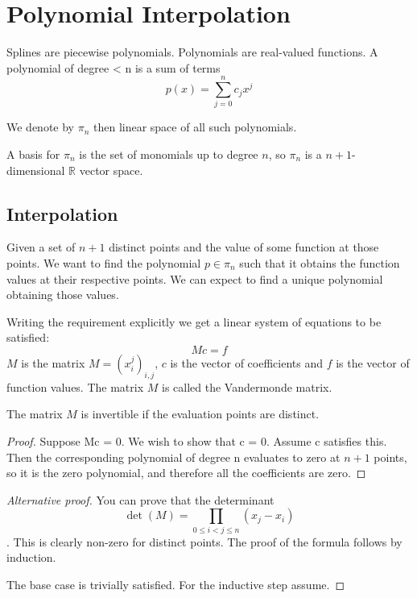 
\chapter{Polynomial Interpolation}

Splines are piecewise polynomials.
Polynomials are real-valued functions.
A polynomial of degree < n is a sum of terms
\begin{equation*}
p(x) = \sum_{j=0}^n c_j x^j
\end{equation*}

We denote by $\pi_n$ then linear space of all such polynomials.

A basis for $\pi_n$ is the set of monomials up to degree $n$, so $\pi_n$ is a $n + 1$-dimensional $\mathbb R$ vector space.

\section{Interpolation}

Given a set of $n + 1$ distinct points and the value of some function at those points.
We want to find the polynomial $p\in\pi_n$ such that it obtains the function values at their respective points.
We can expect to find a unique polynomial obtaining those values.

Writing the requirement explicitly we get a linear system of equations to be satisfied:
\begin{equation*}
Mc = f
\end{equation*}
$M$ is the matrix $M=(x_i^j)_{i,j}$, $c$ is the vector of coefficients and $f$ is the vector of function values.
The matrix $M$ is called the Vandermonde matrix. 

\begin{theorem}
The matrix $M$ is invertible if the evaluation points are distinct.
\end{theorem}
\begin{proof}
Suppose Mc = 0. We wish to show that c = 0.
Assume c satisfies this. Then the corresponding polynomial of degree n evaluates to zero at $n + 1$ points, so it is the zero polynomial, and therefore all the coefficients are zero.
\end{proof}

\begin{proof}[Alternative proof]
You can prove that the determinant
\begin{equation*}
\det(M)= \prod_{0\leq i < j \leq n} (x_j - x_i)
\end{equation*}.
This is clearly non-zero for distinct points.
The proof of the formula follows by induction.

The base case is trivially satisfied.
For the inductive step assume.
\end{proof}

